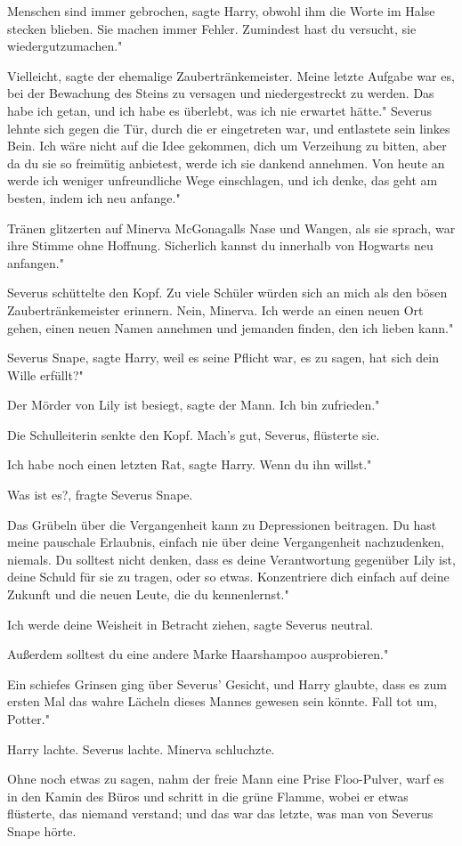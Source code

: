 \glqq{}Menschen sind immer gebrochen\grqq{}, sagte Harry, obwohl ihm die Worte im
Halse stecken blieben. \glqq{}Sie machen immer Fehler. Zumindest hast du
versucht, sie wiedergutzumachen."

\glqq{}Vielleicht\grqq{}, sagte der ehemalige Zaubertränkemeister. \glqq{}Meine
letzte Aufgabe war es, bei der Bewachung des Steins zu versagen und
niedergestreckt zu werden. Das habe ich getan, und ich habe es überlebt, was ich
nie erwartet hätte." Severus lehnte sich gegen die Tür, durch die er eingetreten
war, und entlastete sein linkes Bein. \glqq{}Ich wäre nicht auf die Idee
gekommen, dich um Verzeihung zu bitten, aber da du sie so freimütig anbietest,
werde ich sie dankend annehmen. Von heute an werde ich weniger unfreundliche
Wege einschlagen, und ich denke, das geht am besten, indem ich neu anfange."

Tränen glitzerten auf Minerva McGonagalls Nase und Wangen, als sie sprach, war
ihre Stimme ohne Hoffnung. \glqq{}Sicherlich kannst du innerhalb von Hogwarts neu
anfangen."

Severus schüttelte den Kopf. \glqq{}Zu viele Schüler würden sich an mich als den
bösen Zaubertränkemeister erinnern. Nein, Minerva. Ich werde an einen neuen Ort
gehen, einen neuen Namen annehmen und jemanden finden, den ich lieben kann."

\glqq{}Severus Snape\grqq{}, sagte Harry, weil es seine Pflicht war, es zu sagen,
\glqq{}hat sich dein Wille erfüllt?"

\glqq{}Der Mörder von Lily ist besiegt\grqq{}, sagte der Mann. \glqq{}Ich bin
zufrieden."

Die Schulleiterin senkte den Kopf. \glqq{}Mach's gut, Severus\grqq{}, flüsterte
sie.

\glqq{}Ich habe noch einen letzten Rat\grqq{}, sagte Harry. \glqq{}Wenn du ihn
willst."

\glqq{}Was ist es?\grqq{}, fragte Severus Snape.

\glqq{}Das Grübeln über die Vergangenheit kann zu Depressionen beitragen. Du hast
meine pauschale Erlaubnis, einfach nie über deine Vergangenheit nachzudenken,
niemals. Du solltest nicht denken, dass es deine Verantwortung gegenüber Lily
ist, deine Schuld für sie zu tragen, oder so etwas. Konzentriere dich einfach
auf deine Zukunft und die neuen Leute, die du kennenlernst."

\glqq{}Ich werde deine Weisheit in Betracht ziehen\grqq{}, sagte Severus neutral.

\glqq{}Außerdem solltest du eine andere Marke Haarshampoo ausprobieren."

Ein schiefes Grinsen ging über Severus' Gesicht, und Harry glaubte, dass es zum
ersten Mal das wahre Lächeln dieses Mannes gewesen sein könnte. \glqq{}Fall tot
um, Potter."

Harry lachte. Severus lachte. Minerva schluchzte.

Ohne noch etwas zu sagen, nahm der freie Mann eine Prise Floo-Pulver, warf es in
den Kamin des Büros und schritt in die grüne Flamme, wobei er etwas flüsterte,
das niemand verstand; und das war das letzte, was man von Severus Snape hörte.

